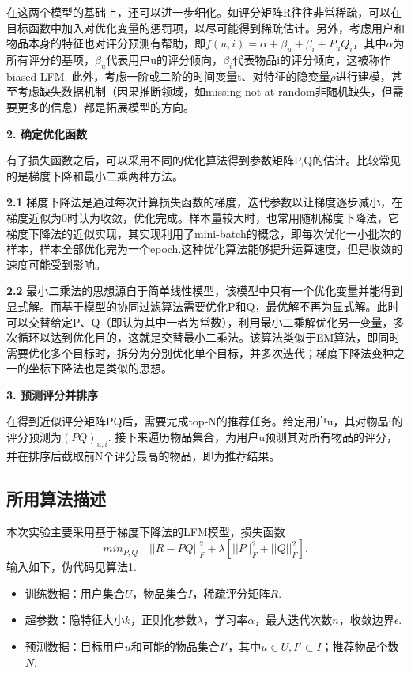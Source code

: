 \documentclass[12pt, a4paper]{ctexart}
\begin{document}
在这两个模型的基础上，还可以进一步细化。如评分矩阵R往往非常稀疏，可以在目标函数中加入对优化变量的惩罚项，以尽可能得到稀疏估计。另外，考虑用户和物品本身的特征也对评分预测有帮助，即$f(u,i)=\alpha+\beta_u+\beta_i+P_uQ_i$，其中$\alpha$为所有评分的基项，$\beta_u$代表用户u的评分倾向，$\beta_i$代表物品i的评分倾向，这被称作biased-LFM. 此外，考虑一阶或二阶的时间变量t、对特征的隐变量$\rho$进行建模，甚至考虑缺失数据机制（因果推断领域，如missing-not-at-random非随机缺失，但需要更多的信息）都是拓展模型的方向。

\textbf{2. 确定优化函数}

有了损失函数之后，可以采用不同的优化算法得到参数矩阵P,Q的估计。比较常见的是梯度下降和最小二乘两种方法。

\textbf{2.1} 梯度下降法是通过每次计算损失函数的梯度，迭代参数以让梯度逐步减小，在梯度近似为0时认为收敛，优化完成。样本量较大时，也常用随机梯度下降法，它梯度下降法的近似实现，其实现利用了mini-batch的概念，即每次优化一小批次的样本，样本全部优化完为一个epoch.这种优化算法能够提升运算速度，但是收敛的速度可能受到影响。

\textbf{2.2} 最小二乘法的思想源自于简单线性模型，该模型中只有一个优化变量并能得到显式解。而基于模型的协同过滤算法需要优化P和Q，最优解不再为显式解。此时可以交替给定P、Q（即认为其中一者为常数），利用最小二乘解优化另一变量，多次循环以达到优化目的，这就是交替最小二乘法。该算法类似于EM算法，即同时需要优化多个目标时，拆分为分别优化单个目标，并多次迭代；梯度下降法变种之一的坐标下降法也是类似的思想。


\textbf{3. 预测评分并排序}

在得到近似评分矩阵PQ后，需要完成top-N的推荐任务。给定用户u，其对物品i的评分预测为$(PQ)_{u,i}$. 接下来遍历物品集合，为用户u预测其对所有物品的评分，并在排序后截取前N个评分最高的物品，即为推荐结果。

\subsection{所用算法描述}

本次实验主要采用基于梯度下降法的LFM模型，损失函数
$$min_{P,Q}\quad {||R-PQ||_F^2+\lambda[||P||_F^2+||Q||_F^2]}.$$
输入如下，伪代码见算法1.
\begin{itemize}
    \item 训练数据：用户集合$U$，物品集合$I$，稀疏评分矩阵$R$.
    \item 超参数：隐特征大小$k$，正则化参数$\lambda$，学习率$\alpha$，最大迭代次数$n$，收敛边界$\epsilon$.
    \item 预测数据：目标用户$u$和可能的物品集合$I'$，其中$u\in U,I'\subset I$；推荐物品个数$N$.
\end{itemize}
\end{document}
